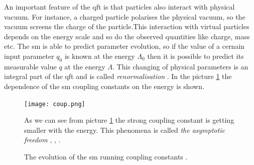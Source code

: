 An important feature of the \gls{qft} is that particles also interact with physical vacuum. For instance, a charged particle polarises the physical vacuum, so the vacuum screens the charge of the particle\cite{Schwinger_polariz}.This interaction with virtual particles depends on the energy scale and so do the observed quantities like charge, mass etc. The \gls{sm} is able to predict parameter evolution, so if the value of a cernain input parameter $q_0$ is known at the energy $\Lambda_0$ then it is possible to predict its measurable value $q$ at the energy $\Lambda$. This changing of physical parameters is an integral part of the \gls{qft} and is called \textit{renormalisation}\cite{bogol} \cite{Glashow:1959wxa}. In the picture \ref{fig::running} the dependence of the \gls{sm} coupling constants on the energy is shown. \\

	 \begin{figure}[htpb]
	\texttt{[image: coup.png]}
	\caption{The evolution of the \gls{sm} running coupling constants \cite{coupl_wiki}. }
	\label{fig::running}
	
As we can see from picture \ref{fig::running} the strong coupling constant is getting smaller with the energy. This phenomena is called \textit{the asymptotic freedom} \cite{Gross}, \cite{Politzer}, \cite{Vanyashin}.
\end{figure}



